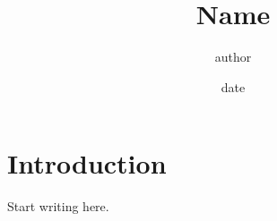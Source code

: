 \documentclass[11pt]{article}
\title{{{Name}}}
\author{{{author}}}
\date{{{date}}}
\begin{document}
\maketitle

\section{Introduction}

Start writing here.
\end{document}
